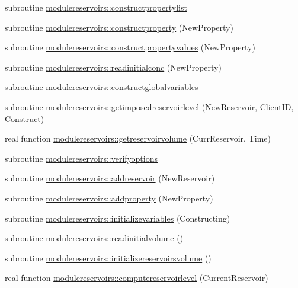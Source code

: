 \begin{DoxyCompactItemize}
\item 
subroutine \mbox{\hyperlink{namespacemodulereservoirs_a96a0b204df7b8cbf62057d7868d8aaa1}{modulereservoirs\+::constructpropertylist}}
\item 
subroutine \mbox{\hyperlink{namespacemodulereservoirs_a67e585ed4eb36afe43471887a3a9744c}{modulereservoirs\+::constructproperty}} (New\+Property)
\item 
subroutine \mbox{\hyperlink{namespacemodulereservoirs_a45a6c59f07c2eaae456d1a07476b8b6c}{modulereservoirs\+::constructpropertyvalues}} (New\+Property)
\item 
subroutine \mbox{\hyperlink{namespacemodulereservoirs_a211f03dad795e61e39d0f58b7002bb26}{modulereservoirs\+::readinitialconc}} (New\+Property)
\item 
subroutine \mbox{\hyperlink{namespacemodulereservoirs_adb9f7b2b418dc95e774855d03c82b302}{modulereservoirs\+::constructglobalvariables}}
\item 
subroutine \mbox{\hyperlink{namespacemodulereservoirs_a22d1b1d83488cecbdcf52565d3aa4e99}{modulereservoirs\+::getimposedreservoirlevel}} (New\+Reservoir, Client\+ID, Construct)
\item 
real function \mbox{\hyperlink{namespacemodulereservoirs_afabb38607932bfaede946ccbce22734d}{modulereservoirs\+::getreservoirvolume}} (Curr\+Reservoir, Time)
\item 
subroutine \mbox{\hyperlink{namespacemodulereservoirs_af13cf54fd0c086fab90e6f36d294bc57}{modulereservoirs\+::verifyoptions}}
\item 
subroutine \mbox{\hyperlink{namespacemodulereservoirs_aae6c3ff2990d073d614eb9e50d1658b9}{modulereservoirs\+::addreservoir}} (New\+Reservoir)
\item 
subroutine \mbox{\hyperlink{namespacemodulereservoirs_a2452a1e02e4d13c0c920c8d181bf2e79}{modulereservoirs\+::addproperty}} (New\+Property)
\item 
subroutine \mbox{\hyperlink{namespacemodulereservoirs_a1e658ea45a1665c254648477f576c633}{modulereservoirs\+::initializevariables}} (Constructing)
\item 
subroutine \mbox{\hyperlink{namespacemodulereservoirs_a392b0a0c6b8aeaf0e9cd41b21b155341}{modulereservoirs\+::readinitialvolume}} ()
\item 
subroutine \mbox{\hyperlink{namespacemodulereservoirs_a3194d2a617c1c30dfa86442b6dbe1c31}{modulereservoirs\+::initializereservoirsvolume}} ()
\item 
real function \mbox{\hyperlink{namespacemodulereservoirs_a473bf29bfb29eda6a398dead645aec5a}{modulereservoirs\+::computereservoirlevel}} (Current\+Reservoir)

\end{DoxyCompactItemize}

